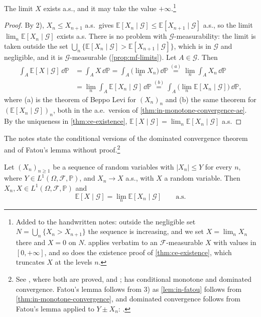 The limit $X$ exists a.s., and it may take the value $+\infty$.\footnote{Added to the handwritten
notes: outside the negligible set $N=\bigcup_n\{X_n>X_{n+1}\}$ the sequence is increasing, and we
set $X=\lim_nX_n$ there and $X=0$ on $N$.  applies verbatim to
an $\mathcal F$-measurable $X$ with values in $[0,+\infty]$, and so does the existence proof of
\cref{thm:ce-existence}, which truncates $X$ at the levels $n$.}

\begin{proof}
By 2), $X_n\le X_{n+1}$ a.s.\ gives $\mathbb E[X_n\mid\mathcal G]\le\mathbb E[X_{n+1}\mid\mathcal G]$
a.s., so the limit $\lim_n\mathbb E[X_n\mid\mathcal G]$ exists a.s. There is no problem with
$\mathcal G$-measurability: the limit is taken outside the set
$\bigcup_n\{\mathbb E[X_n\mid\mathcal G]>\mathbb E[X_{n+1}\mid\mathcal G]\}$, which is in $\mathcal G$
and negligible, and it is $\mathcal G$-measurable (\cref{prop:mf-limits}). Let $A\in\mathcal G$.
Then
\[
\begin{aligned}
  \int_A\mathbb E[X\mid\mathcal G]\,\dd\mathbb P&=\int_AX\,\dd\mathbb P=\int_A\big(\lim_nX_n\big)\,\dd\mathbb P
  \overset{(a)}{=}\lim_n\int_AX_n\,\dd\mathbb P\\
  &=\lim_n\int_A\mathbb E[X_n\mid\mathcal G]\,\dd\mathbb P
  \overset{(b)}{=}\int_A\big(\lim_n\mathbb E[X_n\mid\mathcal G]\big)\,\dd\mathbb P,
\end{aligned}
\]
where (a) is the theorem of Beppo Levi for $(X_n)_n$ and (b) the same theorem for
$(\mathbb E[X_n\mid\mathcal G])_n$, both in the a.e.\ version of
\cref{thm:in-monotone-convergence-ae}. By the uniqueness in \cref{thm:ce-existence},
$\mathbb E[X\mid\mathcal G]=\lim_n\mathbb E[X_n\mid\mathcal G]$ a.s.
\end{proof}

The notes state the conditional versions of the dominated convergence theorem and of Fatou's
lemma without proof.\footnote{See \citet[Section~9.7]{williams}, where both are proved, and
\citet[Section~34]{billingsley}; \citet[Sections~4.1 and~4.6]{durrett} has conditional monotone and
dominated convergence. Fatou's lemma follows from 3) as \cref{lem:in-fatou} follows from
\cref{thm:in-monotone-convergence}, and dominated convergence follows from Fatou's lemma applied to
$Y\pm X_n$: .}

\begin{theorem}\label{thm:cp-dominated-convergence}
Let $(X_n)_{n\ge1}$ be a sequence of random variables with $|X_n|\le Y$ for every $n$, where
$Y\in L^1(\Omega,\mathcal F,\mathbb P)$, and $X_n\to X$ a.s., with $X$ a random variable. Then
$X_n,X\in L^1(\Omega,\mathcal F,\mathbb P)$ and
\[
  \mathbb E[X\mid\mathcal G]=\lim_n\mathbb E[X_n\mid\mathcal G]\qquad\text{a.s.}
\]
\end{theorem}

